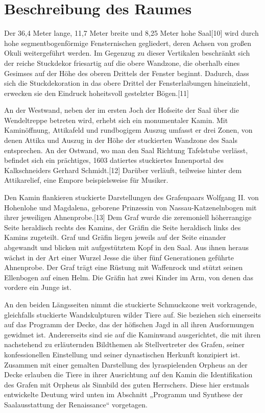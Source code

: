 \documentclass[
  a4paper,
  openany]{book}
\begin{document}
\section{Beschreibung des Raumes}\label{beschreibung-des-raumes}

Der 36,4 Meter lange, 11,7 Meter breite und 8,25 Meter hohe Saal{[}10{]}
wird durch hohe segmentbogenförmige Fensternischen gegliedert, deren
Achsen von großen Okuli weitergeführt werden. Im Gegenzug zu dieser
Vertikalen beschränkt sich der reiche Stuckdekor friesartig auf die
obere Wandzone, die oberhalb eines Gesimses auf der Höhe des oberen
Drittels der Fenster beginnt. Dadurch, dass sich die Stuckdekoration in
das obere Drittel der Fensterlaibungen hineinzieht, erwecken sie den
Eindruck hoheitsvoll gestelzter Bögen.{[}11{]}

An der Westwand, neben der im ersten Joch der Hofseite der Saal über die
Wendeltreppe betreten wird, erhebt sich ein monumentaler Kamin. Mit
Kaminöffnung, Attikafeld und rundbogigem Auszug umfasst er drei Zonen,
von denen Attika und Auszug in der Höhe der stuckierten Wandzone des
Saals entsprechen. An der Ostwand, wo man den Saal Richtung Tafelstube
verlässt, befindet sich ein prächtiges, 1603 datiertes stuckiertes
Innenportal des Kalkschneiders Gerhard Schmidt.{[}12{]} Darüber
verläuft, teilweise hinter dem Attikarelief, eine Empore beispielsweise
für Musiker.

Den Kamin flankieren stuckierte Darstellungen des Grafenpaars Wolfgang
II. von Hohenlohe und Magdalena, geborene Prinzessin von
Nassau-Katzenelnbogen mit ihrer jeweiligen Ahnenprobe.{[}13{]} Dem Graf
wurde die zeremoniell höherrangige Seite heraldisch rechts des Kamins,
der Gräfin die Seite heraldisch links des Kamins zugeteilt. Graf und
Gräfin liegen jeweils auf der Seite einander abgewandt und blicken mit
aufgestütztem Kopf in den Saal. Aus ihnen heraus wächst in der Art einer
Wurzel Jesse die über fünf Generationen geführte Ahnenprobe. Der Graf
trägt eine Rüstung mit Waffenrock und stützt seinen Ellenbogen auf einen
Helm. Die Gräfin hat zwei Kinder im Arm, von denen das vordere ein Junge
ist.

An den beiden Längsseiten nimmt die stuckierte Schmuckzone weit
vorkragende, gleichfalls stuckierte Wandskulpturen wilder Tiere auf. Sie
beziehen sich einerseits auf das Programm der Decke, das der höfischen
Jagd in all ihren Ausformungen gewidmet ist. Andererseits sind sie auf
die Kaminwand ausgerichtet, die mit ihren nachstehend zu erläuternden
Bildthemen als Stellvertreter des Grafen, seiner konfessionellen
Einstellung und seiner dynastischen Herkunft konzipiert ist. Zusammen
mit einer gemalten Darstellung des lyraspielenden Orpheus an der Decke
erlauben die Tiere in ihrer Ausrichtung auf den Kamin die Identifikation
des Grafen mit Orpheus als Sinnbild des guten Herrschers. Diese hier
erstmals entwickelte Deutung wird unten im Abschnitt „Programm und
Synthese der Saalausstattung der Renaissance`` vorgetagen.
\end{document}
